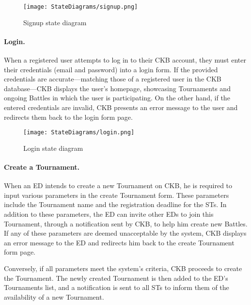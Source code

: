 \begin{figure}[H]
    \begin{center}
        \texttt{[image: StateDiagrams/signup.png]}
        \caption{Signup state diagram}
        \label{fig:signup_sd}%
    \end{center}
\end{figure}

\paragraph{Login.}
When a registered user attempts to log in to their CKB account, they must enter their credentials (email and password) into a login form. If the provided credentials are accurate—matching those of a registered user in the CKB database—CKB displays the user's homepage, showcasing Tournaments and ongoing Battles in which the user is participating. On the other hand, if the entered credentials are invalid, CKB presents an error message to the user and redirects them back to the login form page.

\begin{figure}[H]
    \begin{center}
        \texttt{[image: StateDiagrams/login.png]}
        \caption{Login state diagram}
        \label{fig:login_sd}%
    \end{center}
\end{figure}

\paragraph{Create a Tournament.}
When an ED intends to create a new Tournament on CKB, he is required to input various parameters in the create Tournament form. These parameters include the Tournament name and the registration deadline for the STs. In addition to these parameters, the ED can invite other EDs to join this Tournament, through a notification sent by CKB, to help him create new Battles. If any of these parameters are deemed unacceptable by the system, CKB displays an error message to the ED and redirects him back to the create Tournament form page.

Conversely, if all parameters meet the system's criteria, CKB proceeds to create the Tournament. The newly created Tournament is then added to the ED's Tournaments list, and a notification is sent to all STs to inform them of the availability of a new Tournament.

